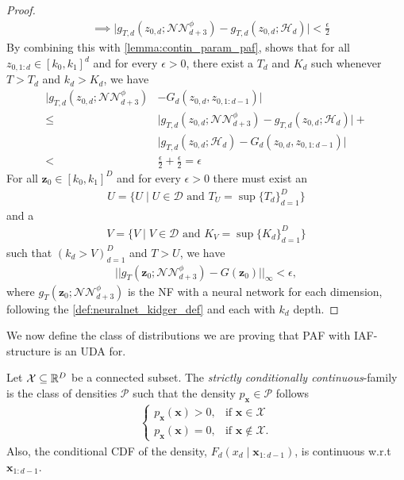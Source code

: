 \begin{proof}
\begin{align*}
        &\implies \lvert g_{T,d}(z_{0,d} ; \mathcal{NN}_{d+3}^{\phi}) - g_{T,d}(z_{0,d} ; \mathcal{H}_d)\rvert < \frac{\epsilon}{2}
    \end{align*}
    By combining this with \cref{lemma:contin_param_paf}, shows that for all \(z_{0, 1:d} \in [k_0,k_1]^{d}\) and for every \(\epsilon > 0\),
    there exist a \(T_d\) and \(K_d\) such whenever \(T > T_d\) and \(k_d > K_d\), we have
    \begin{align*}
        \lvert g_{T,d}(z_{0,d};\mathcal{NN}_{d+3}^{\phi}) &- G_d(z_{0,d}, z_{0,1:d-1})\rvert \\
        \leq &\lvert g_{T,d}(z_{0,d};\mathcal{NN}_{d+3}^{\phi}) - g_{T,d}(z_{0,d};\mathcal{H}_d)\rvert + \\
        &\lvert g_{T,d}(z_{0,d};\mathcal{H}_d) - 
        G_d(z_{0,d}, z_{0,1:d-1})\rvert\\
        < &\frac{\epsilon}{2} + \frac{\epsilon}{2} = \epsilon
    \end{align*}
    For all \(\bm z_0 \in [k_0,k_1]^D\) and for every \(\epsilon > 0\) there must exist an 
    \begin{align*}
        U = \{U \mid U \in \mathcal{D} \text{ and } T_U = \sup\{T_d\}_{d=1}^D\}
    \end{align*}
    and a
    \begin{align*}
        V = \{V \mid V \in \mathcal{D} \text{ and } K_V = \sup\{K_d\}_{d=1}^D\}
    \end{align*}
    such that \((k_d > V)_{d=1}^D\) and \(T > U\), we have
    \begin{align*}
        \lvert\lvert g_{T}(\bm z_0;\mathcal{NN}_{d+3}^{\phi}) - G(\bm z_{0}) \rvert\rvert_{\infty} < \epsilon,
    \end{align*}
    where \(g_T(\bm z_0 ;\mathcal{NN}_{d+3}^{\phi})\) is the NF with a neural network for each dimension, following
    the \cref{def:neuralnet_kidger_def} and each with \(k_d\) depth.
\end{proof}
We now define the class 
of distributions we are proving that PAF with IAF-structure is an UDA for. 
\begin{definition}\label{def:strict_condit_fam}
    Let \(\mathcal{X} \subseteq \mathbb{R}^D\) be a connected subset.
    The \emph{strictly conditionally continuous}-family is the class of densities 
    \(\mathscr{P}\) such that the density \(p_{\bm x} \in \mathscr{P}\) follows
    \begin{align*}
        \begin{cases}
            p_{\bm x}(\bm x)  > 0, & \text{if \(\bm x \in \mathcal{X}\)}\\
            p_{\bm x}(\bm x) = 0, & \text{if \(\bm x \notin \mathcal{X}\)}.
        \end{cases}
    \end{align*}
    Also, the conditional CDF of the density, \(F_d(x_d \mid \bm x_{1:d-1})\), is continuous w.r.t \(\bm x_{1:d-1}\). 
\end{definition}
